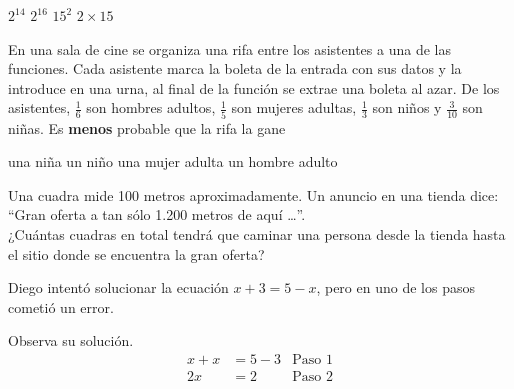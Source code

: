 \documentclass[10pt,letterpaper,addpoints]{exam}
\begin{document}
\begin{questions}
\begin{oneparchoices}
\CorrectChoice $2^{14}$
\choice $2^{16}$
\choice $15^{2}$
\choice $2\times 15$
\end{oneparchoices}
\question En una sala de cine se organiza una rifa entre los asistentes a una de las funciones. Cada asistente marca la boleta de la entrada con sus datos y la introduce en una urna, al final de la función se extrae una boleta al azar. De los asistentes, $\frac{1}{6}$ son hombres adultos, $\frac{1}{5}$ son mujeres adultas, $\frac{1}{3}$ son niños y  $\frac{3}{10}$     son niñas. Es \textbf{menos} probable que la rifa la gane

\begin{oneparchoices}
\choice una niña
\choice un niño
\choice una mujer adulta
\CorrectChoice un hombre adulto
\end{oneparchoices}
\question Una cuadra mide 100 metros aproximadamente. Un anuncio en una tienda dice: “Gran oferta a tan sólo 1.200 metros de aquí \ldots ”.\\ 

¿Cuántas cuadras en total tendrá que caminar una persona desde la tienda hasta el sitio donde se encuentra la gran oferta?

\begin{oneparchoices}
\end{oneparchoices}
\question Diego intentó solucionar la ecuación $x + 3 = 5 - x$, pero en uno de los pasos cometió un error.

Observa su solución.
\begin{align*}
 x+x&=5-3 & \mbox{Paso 1}\\
 2x&=2 & \mbox{Paso 2}\\ 
\end{align*}
\end{questions}
\end{document}
